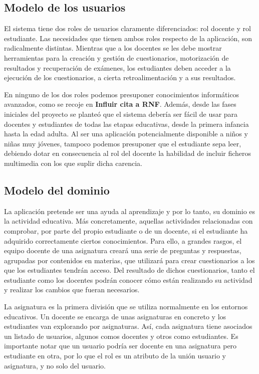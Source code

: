 \subsection{Modelo de los usuarios}


El sistema tiene dos roles de usuarios claramente diferenciados: rol docente y rol estudiante. Las necesidades que tienen ambos roles respecto de la aplicación, son radicalmente distintas. Mientras que a los docentes se les debe mostrar herramientas para la creación y gestión de cuestionarios, motorización de resultados y recuperación de exámenes, los estudiantes deben acceder a la ejecución de los cuestionarios, a cierta retroalimentación y a sus resultados.

En ninguno de los dos roles podemos presuponer conocimientos informáticos avanzados, como se recoje en \textbf{Influir cita a RNF}. Además, desde las fases iniciales del proyecto se planteó que el sistema debería ser fácil de usar para docentes y estudiantes de todas las etapas educativas, desde la primera infancia hasta la edad adulta. Al ser una aplicación potencialmente disponible a niños y niñas muy jóvenes, tampoco podemos presuponer que el estudiante sepa leer, debiendo dotar en consecuencia al rol del docente la habilidad de incluir ficheros multimedia con los que suplir dicha carencia.

\subsection{Modelo del dominio}

La aplicación pretende ser una ayuda al aprendizaje y por lo tanto, su dominio es la actividad educativa. Más concretamente, aquellas actividades relacionadas con comprobar, por parte del propio estudiante o de un docente, si el estudiante ha adquirido correctamente ciertos conocimientos. Para ello, a grandes rasgos, el equipo docente de una asignatura creará una serie de preguntas y respuestas, agrupadas por contenidos en materias, que utilizará para crear cuestionarios a los que los estudiantes tendrán acceso. Del resultado de dichos cuestionarios, tanto el estudiante como los docentes podrán conocer cómo están realizando su actividad y realizar los cambios que fueran necesarios.

La asignatura es la primera división que se utiliza normalmente en los entornos educativos. Un docente se encarga de unas asignaturas en concreto y los estudiantes van explorando por asignaturas. Así, cada asignatura tiene asociados un listado de usuarios, algunos comos docentes y otros como estudiantes. Es importante notar que un usuario podría ser docente en una asignatura pero estudiante en otra, por lo que el rol es un atributo de la unión usuario y asignatura, y no solo del usuario.

